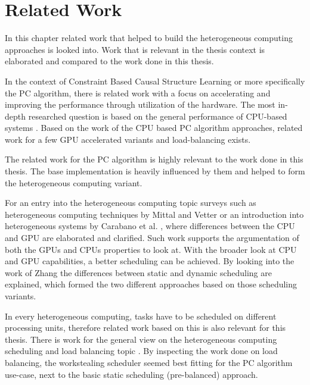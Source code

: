 \chapter{Related Work}
In this chapter related work that helped to build the heterogeneous computing approaches is looked into. Work that is relevant in the thesis context is elaborated and compared to the work done in this thesis.

In the context of Constraint Based Causal Structure Learning or more specifically the PC algorithm, there is related work with a focus on accelerating and improving the performance through utilization of the hardware. The most in-depth researched question is based on the general performance of CPU-based systems \cite{leFastPCAlgorithm2019, leParallelPCPackageEfficient2015, schmidtLoadBalancedParallelConstraintBased2019, colomboOrderIndependentConstraintBasedCausal,kalischEstimatingHighDimensionalDirected2007,scutariBayesianNetworkConstraintBased2017}. Based on the work of the CPU based PC algorithm approaches, related work for a few GPU accelerated variants \cite{schmidtOrderIndependentConstraintBasedCausal2018,zarebavaniCuPCCUDAbasedParallel2018} and load-balancing \cite{schmidtLoadBalancedParallelConstraintBased2019} exists.

The related work for the PC algorithm is highly relevant to the work done in this thesis. The base implementation is heavily influenced by them and helped to form the heterogeneous computing variant.

For an entry into the heterogeneous computing topic surveys such as heterogeneous computing techniques by Mittal and Vetter \cite{mittalSurveyCPUGPUHeterogeneous2015} or an introduction into heterogeneous systems by Carabano et al. \cite{carabanoExplorationHeterogeneousSystems2013}, where differences between the CPU and GPU are elaborated and clarified. Such work supports the argumentation of both the GPUs and CPUs properties to look at. With the broader look at CPU and GPU capabilities, a better scheduling can be achieved. By looking into the work of Zhang \cite{zhangDynamicStaticLoad1991} the differences between static and dynamic scheduling are explained, which formed the two different approaches based on those scheduling variants.

In every heterogeneous computing, tasks have to be scheduled on different processing units, therefore related work based on this is also relevant for this thesis. There is work for the general view on the heterogeneous computing scheduling and load balancing topic \cite{abdelkaderDynamicTaskScheduling2012,binottoDynamicReconfigurableLoadbalancing2010,galindoDynamicLoadBalancing2008,kopetzRealTimeScheduling1997,kwokStaticSchedulingAlgorithms1999,momcilovicDynamicLoadBalancing2014,singhSurveyStaticScheduling2015}. By inspecting the work done on load balancing, the workstealing scheduler seemed best fitting for the PC algorithm use-case, next to the basic static scheduling (pre-balanced) approach.


